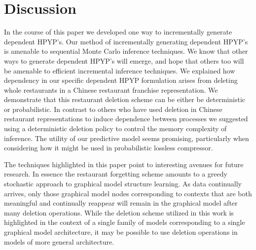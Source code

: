 \section{Discussion}
\label{discussion}

In the course of this paper we developed one way to incrementally generate dependent HPYP's.  Our method of incrementally generating dependent HPYP's is amenable to sequential Monte Carlo inference techniques.  We know that other ways to generate dependent HPYP's will emerge, and hope that others too will be amenable to efficient incremental inference techniques.  We explained how dependency in our specific dependent HPYP formulation arises from deleting whole restaurants in a Chinese restaurant franchise representation.  We demonstrate that this restaurant deletion scheme can be either be deterministic or probabilistic.  In contrast to others who have used deletion in Chinese restaurant representations to induce dependence between processes we suggested using a deterministic deletion policy to control the memory complexity of inference.  The utility of our predictive model seems promising, particularly when considering how it might be used in probabilistic lossless compressor.

The techniques highlighted in this paper point to interesting avenues for future research.  In essence the restaurant forgetting scheme amounts to a greedy stochastic approach to graphical model structure learning.  As data continually arrives, only those graphical model nodes corresponding to contexts that are both meaningful and continually reappear will remain in the graphical model after many deletion operations.   While the deletion scheme utilized in this work is highlighted in the context of a single family of models corresponding to a single graphical model architecture, it may be possible to use deletion operations in models of more general architecture.